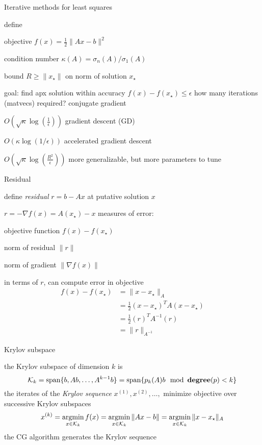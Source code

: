 \documentclass[presentation,xcolor={usenames,dvipsnames}]{beamer}
\begin{document}
\begin{frame}{Iterative methods for least squares}

define
\bit
\item objective $f(x) = \frac 1 2 \|Ax - b\|^2$
\item condition number $\kappa(A) = \sigma_n (A) / \sigma_1(A)$
\item bound $R \geq \|x_\star\|$ on norm of solution $x_\star$
\item goal: find apx solution within accuracy $f(x) - f(x_\star) \leq \epsilon$
\eit
\pause
how many iterations (matvecs) required?
  \bit
  \pitem conjugate gradient
  \bit \item $O\left(\sqrt{\kappa}\log(\frac{1}{\epsilon})\right)$ \eit
  \pitem gradient descent (GD)
  \bit \item $O\left(\kappa \log(1/\epsilon)\right)$ \eit
  \pitem accelerated gradient descent
  \bit \item $O\left(\sqrt{\kappa}\log(\frac{R^2}{\epsilon})\right)$ more generalizable, but more parameters to tune \eit
  \eit


\end{frame}

\begin{frame}{Residual}

define \emph{residual} $r = b - Ax$ at putative solution $x$
\bit
\item $r = -\nabla f(x) = A(x_\star) - x$
\eit
\pause \vfill
measures of error:
\bit
\item objective function $f(x) - f(x_\star)$
\item norm of residual $\| r \|$
\item norm of gradient $\| \nabla f(x) \|$
\item in terms of $r$, can compute error in objective
\begin{align}
f(x)-f(x_\star) &= \|x - x_\star\|_A \\
&= \frac 1 2 (x - x_\star)^T A (x - x_\star) \\
&= \frac 1 2 (r)^T A^{-1} (r) \\
&= \|r\|_{A^{-1}}
\end{align}
\eit

\end{frame}

\begin{frame}{Krylov subspace}

the Krylov subspace of dimension $k$ is
\[
\mathcal K_k = \mbox{\textrm{span}}\{b, Ab, \ldots, A^{k-1} b\} = \mbox{\textrm{span}}\{p_k(A)b \mod \mathop{\bf degree}(p) < k\}
\]
\pause \vfill
the iterates of the \emph{Krylov sequence} $x^{(1)}, x^{(2)}, \ldots,$ minimize objective over successive Krylov subspaces
\[
x^{(k)} = \mathop{\rm argmin}_{x \in \mathcal K_k} f(x) = \mathop{\rm argmin}_{x \in \mathcal K_k} \|Ax - b\| = \mathop{\rm argmin}_{x \in \mathcal K_k} \|x - x_\star\|_A
\]
the CG algorithm generates the Krylov sequence

\end{frame}
\end{document}
